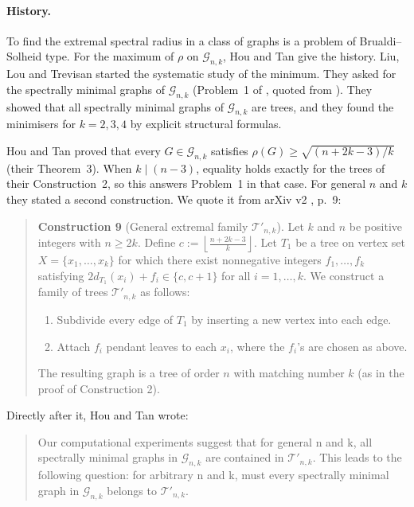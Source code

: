 \documentclass[11pt]{article}
\theoremstyle{definition}
\newcommand{\G}{\mathcal{G}}
\newcommand{\Tp}{\mathcal{T}'}
\begin{document}
\paragraph{History.}
To find the extremal spectral radius in a class of graphs is a problem of
Brualdi--Solheid type. For the maximum of $\rho$ on $\G_{n,k}$, Hou and Tan
\cite{HT} give the history. Liu, Lou and Trevisan \cite{LLT} started the systematic study
of the minimum. They asked for the spectrally minimal graphs of $\G_{n,k}$ (Problem~1 of
\cite{HT}, quoted from \cite{LLT}). They showed that all spectrally minimal graphs of
$\G_{n,k}$ are trees, and they found the minimisers for $k = 2,3,4$ by explicit
structural formulas.

Hou and Tan \cite{HT} proved that every $G \in \G_{n,k}$ satisfies
$\rho(G) \ge \sqrt{(n+2k-3)/k}$ (their Theorem~3). When $k \mid (n-3)$, equality holds
exactly for the trees of their Construction~2, so this answers Problem~1 in that case.
For general $n$ and $k$ they stated a second construction. We quote it from arXiv v2
\cite{HT}, p.~9:

\begin{quote}
\textbf{Construction 9} (General extremal family $\Tp_{n,k}$). Let $k$ and $n$ be positive
integers with $n \ge 2k$. Define $c := \left\lfloor \frac{n+2k-3}{k} \right\rfloor$. Let
$T_1$ be a tree on vertex set $X = \{x_1,\dots,x_k\}$ for which there exist nonnegative
integers $f_1,\dots,f_k$ satisfying $2d_{T_1}(x_i) + f_i \in \{c, c+1\}$ for all
$i = 1,\dots,k$. We construct a family of trees $\Tp_{n,k}$ as follows:
\begin{enumerate}
\item Subdivide every edge of $T_1$ by inserting a new vertex into each edge.
\item Attach $f_i$ pendant leaves to each $x_i$, where the $f_i$'s are chosen as above.
\end{enumerate}
The resulting graph is a tree of order $n$ with matching number $k$ (as in the proof of
Construction 2).
\end{quote}

\noindent Directly after it, Hou and Tan wrote:

\begin{quote}
Our computational experiments suggest that for general n and k, all spectrally minimal
graphs in $\G_{n,k}$ are contained in $\Tp_{n,k}$. This leads to the following question:
for arbitrary n and k, must every spectrally minimal graph in $\G_{n,k}$ belongs to
$\Tp_{n,k}$.
\end{quote}
\end{document}
